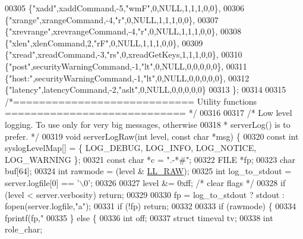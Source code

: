\begin{DoxyCode}
00305     \{\textcolor{stringliteral}{"xadd"},xaddCommand,-5,\textcolor{stringliteral}{"wmF"},0,NULL,1,1,1,0,0\},
00306     \{\textcolor{stringliteral}{"xrange"},xrangeCommand,-4,\textcolor{stringliteral}{"r"},0,NULL,1,1,1,0,0\},
00307     \{\textcolor{stringliteral}{"xrevrange"},xrevrangeCommand,-4,\textcolor{stringliteral}{"r"},0,NULL,1,1,1,0,0\},
00308     \{\textcolor{stringliteral}{"xlen"},xlenCommand,2,\textcolor{stringliteral}{"rF"},0,NULL,1,1,1,0,0\},
00309     \{\textcolor{stringliteral}{"xread"},xreadCommand,-3,\textcolor{stringliteral}{"rs"},0,xreadGetKeys,1,1,1,0,0\},
00310     \{\textcolor{stringliteral}{"post"},securityWarningCommand,-1,\textcolor{stringliteral}{"lt"},0,NULL,0,0,0,0,0\},
00311     \{\textcolor{stringliteral}{"host:"},securityWarningCommand,-1,\textcolor{stringliteral}{"lt"},0,NULL,0,0,0,0,0\},
00312     \{\textcolor{stringliteral}{"latency"},latencyCommand,-2,\textcolor{stringliteral}{"aslt"},0,NULL,0,0,0,0,0\}
00313 \};
00314 
00315 \textcolor{comment}{/*============================ Utility functions ============================ */}
00316 
00317 \textcolor{comment}{/* Low level logging. To use only for very big messages, otherwise}
00318 \textcolor{comment}{ * serverLog() is to prefer. */}
00319 \textcolor{keywordtype}{void} serverLogRaw(\textcolor{keywordtype}{int} level, \textcolor{keyword}{const} \textcolor{keywordtype}{char} *msg) \{
00320     \textcolor{keyword}{const} \textcolor{keywordtype}{int} syslogLevelMap[] = \{ LOG\_DEBUG, LOG\_INFO, LOG\_NOTICE, LOG\_WARNING \};
00321     \textcolor{keyword}{const} \textcolor{keywordtype}{char} *c = \textcolor{stringliteral}{".-*#"};
00322     FILE *fp;
00323     \textcolor{keywordtype}{char} buf[64];
00324     \textcolor{keywordtype}{int} rawmode = (level & \hyperlink{server_8h_a6b3768a4d2dfb3ac580b8d999baa9350}{LL\_RAW});
00325     \textcolor{keywordtype}{int} log\_to\_stdout = server.logfile[0] == \textcolor{stringliteral}{'\(\backslash\)0'};
00326 
00327     level &= 0xff; \textcolor{comment}{/* clear flags */}
00328     \textcolor{keywordflow}{if} (level < server.verbosity) \textcolor{keywordflow}{return};
00329 
00330     fp = log\_to\_stdout ? stdout : fopen(server.logfile,\textcolor{stringliteral}{"a"});
00331     \textcolor{keywordflow}{if} (!fp) \textcolor{keywordflow}{return};
00332 
00333     \textcolor{keywordflow}{if} (rawmode) \{
00334         fprintf(fp,\textcolor{stringliteral}{"%
00335     \} \textcolor{keywordflow}{else} \{
00336         \textcolor{keywordtype}{int} off;
00337         \textcolor{keyword}{struct} timeval tv;
00338         \textcolor{keywordtype}{int} role\_char;
}
\end{DoxyCode}
